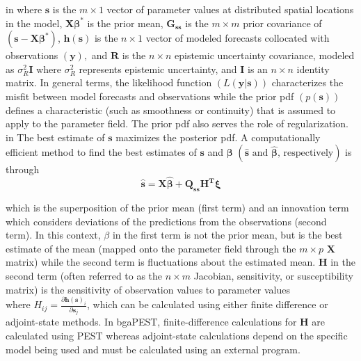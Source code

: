 \documentclass[11pt,oneside,onecolumn]{usgsreport}
\begin{document}
\begin{appendix}
 in
where \textbf{$\mathbf{s}$ }is the $m\times1$ vector of parameter
values at distributed spatial locations in the model, $\mathbf{X\beta^{*}}$
is the prior mean, $\mathbf{G_{ss}}$ is the $m\times m$ prior covariance
of $\left(\mathbf{s}-\mathbf{X\beta^{*}}\right)$, $\mathbf{h\left(\mathbf{s}\right)}$
is the $n\times1$ vector of modeled forecasts collocated with observations
$\left(\mathbf{y}\right),$ and \textbf{$\mathbf{R}$ }is the $n\times n$
epistemic uncertainty covariance, modeled as $\sigma_{R}^{2}\mathbf{I}$
where $\sigma_{R}^{2}$ represents epistemic uncertainty, and $\mathbf{I}$
is an $n\times n$ identity matrix. In general terms, the likelihood
function $\left(L\left(\mathbf{y}|\mathbf{s}\right)\right)$ characterizes
the misfit between model forecasts and observations while the prior
pdf $\left(p\left(\mathbf{s}\right)\right)$ defines a characteristic
(such as smoothness or continuity) that is assumed to apply to the
parameter field. The prior pdf also serves the role of regularization. 
 in
The best estimate of $\mathbf{s}$ maximizes the posterior pdf. A
computationally efficient method to find the best estimates of $\mathbf{s}$
and $\mathbf{\beta}$ $\left(\hat{\mathbf{s}}\mbox{ and }\mathbf{\hat{\beta}}\mbox{, respectively}\right)$
is through
\begin{equation}
\hat{\mathbf{s}}=\mathbf{X\hat{\beta}+Q_{ss}H^{\mathbf{T}}\xi}\label{eq:bestest}
\end{equation}


which is the superposition of the prior mean (first term) and an innovation
term which considers deviations of the predictions from the observations
(second term). In this context, $\beta$ in the first term is not
the prior mean, but is the best estimate of the mean (mapped onto
the parameter field through the $m\times p$ $\mathbf{X}$ matrix)
while the second term is fluctuations about the estimated mean. $\mathbf{H}$
in the second term (often referred to as the $n\times m$ Jacobian,
sensitivity, or susceptibility matrix) is the sensitivity of observation
values to parameter values $\mbox{where }H_{ij}=\frac{\partial\mathbf{h}\left(\mathbf{s}\right)_{i}}{\partial\mathbf{s}_{j}}$,
which can be calculated using either finite difference or adjoint-state
methods. In bgaPEST, finite-difference calculations for $\mathbf{H}$
are calculated using PEST whereas adjoint-state calculations depend
on the specific model being used and must be calculated using an external
program.


\end{appendix}
\end{document}
